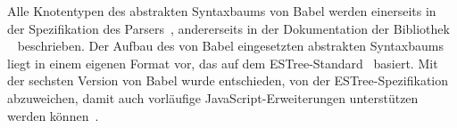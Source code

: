 Alle Knotentypen des abstrakten Syntaxbaums von Babel werden einerseits in der Spezifikation des Parsers~\autocite{BABEL:PARSER_SPEC,BABEL:PARSER}, andererseits in der Dokumentation der Bibliothek ~\autocite{BABEL:TYPES} beschrieben. Der Aufbau des von Babel eingesetzten abstrakten Syntaxbaums liegt in einem eigenen Format vor, das auf dem ESTree-Standard~\autocite{ESTREE_SPEC} basiert. Mit der sechsten Version von Babel wurde entschieden, von der ESTree-Spezifikation abzuweichen, damit auch vorläufige JavaScript-Erweiterungen unterstützen werden können~\autocite{BABEL:STATE_OF_BABEL}.
